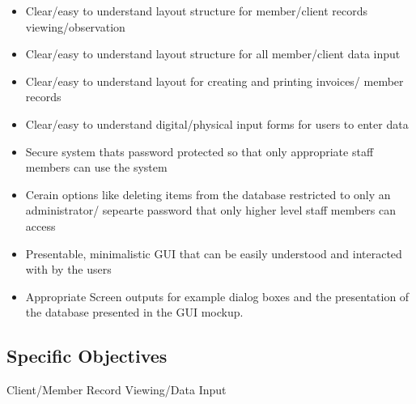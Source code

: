     \begin{itemize}  

        \item Clear/easy to understand layout structure for member/client records viewing/observation 

        \item Clear/easy to understand layout structure for all member/client data input  

        \item Clear/easy to understand layout for creating and printing invoices/ member records
        
        \item Clear/easy to understand digital/physical input forms for users to enter data
        
        \item Secure system thats password protected so that only appropriate staff members can use the system
        
        \item Cerain options like deleting items from the database restricted to only an administrator/ sepearte password that only higher level staff members can access
        
        \item Presentable, minimalistic GUI that can be easily understood and interacted with by the users 
        
        \item Appropriate Screen outputs for example dialog boxes and the presentation of the database presented in the GUI mockup.

    \end{itemize}

\subsection{Specific Objectives}

Client/Member Record Viewing/Data Input

